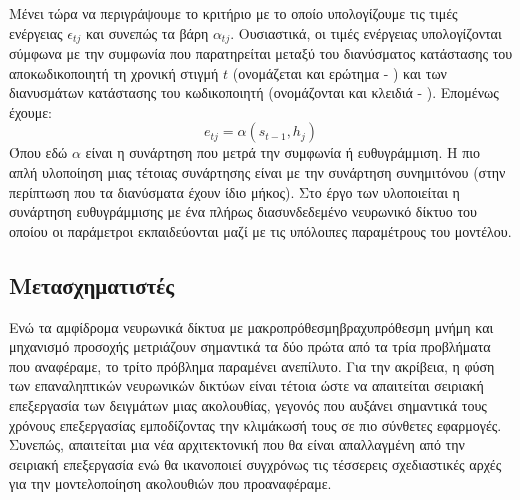 Μένει τώρα να περιγράψουμε το κριτήριο με το οποίο υπολογίζουμε τις τιμές ενέργειας $\epsilon_{tj}$ και συνεπώς τα βάρη $\alpha_{tj}$. Ουσιαστικά, οι τιμές ενέργειας υπολογίζονται σύμφωνα με την συμφωνία που παρατηρείται μεταξύ του διανύσματος κατάστασης του αποκωδικοποιητή τη χρονική στιγμή $t$ (ονομάζεται και ερώτημα - ) και των διανυσμάτων κατάστασης του κωδικοποιητή (ονομάζονται και κλειδιά - ). Επομένως έχουμε:
\[
  e_{tj} = \alpha(s_{t-1}, h_j)
\] Όπου εδώ $\alpha$ είναι η συνάρτηση που μετρά την συμφωνία ή ευθυγράμμιση. Η πιο απλή υλοποίηση μιας τέτοιας συνάρτησης είναι με την συνάρτηση συνημιτόνου (στην περίπτωση που τα διανύσματα έχουν ίδιο μήκος). Στο έργο των  \cite{bahdanau2014neural_machine_translation_attention_begins} υλοποιείται η συνάρτηση ευθυγράμμισης με ένα πλήρως διασυνδεδεμένο νευρωνικό δίκτυο του οποίου οι παράμετροι εκπαιδεύονται μαζί με τις υπόλοιπες παραμέτρους του μοντέλου.

\subsection{Μετασχηματιστές}
\label{sec:transformers}
Ενώ τα αμφίδρομα νευρωνικά δίκτυα με μακροπρόθεσμη\textendash βραχυπρόθεσμη μνήμη και μηχανισμό προσοχής μετριάζουν σημαντικά τα δύο πρώτα από τα τρία προβλήματα που αναφέραμε, το τρίτο πρόβλημα παραμένει ανεπίλυτο. Για την ακρίβεια, η φύση των επαναληπτικών νευρωνικών δικτύων είναι τέτοια ώστε να απαιτείται σειριακή επεξεργασία των δειγμάτων μιας ακολουθίας, γεγονός που αυξάνει σημαντικά τους χρόνους επεξεργασίας εμποδίζοντας την κλιμάκωσή τους σε πιο σύνθετες εφαρμογές. Συνεπώς, απαιτείται μια νέα αρχιτεκτονική που θα είναι απαλλαγμένη από την σειριακή επεξεργασία ενώ θα ικανοποιεί συγχρόνως τις τέσσερεις σχεδιαστικές αρχές για την μοντελοποίηση ακολουθιών που προαναφέραμε.\par

